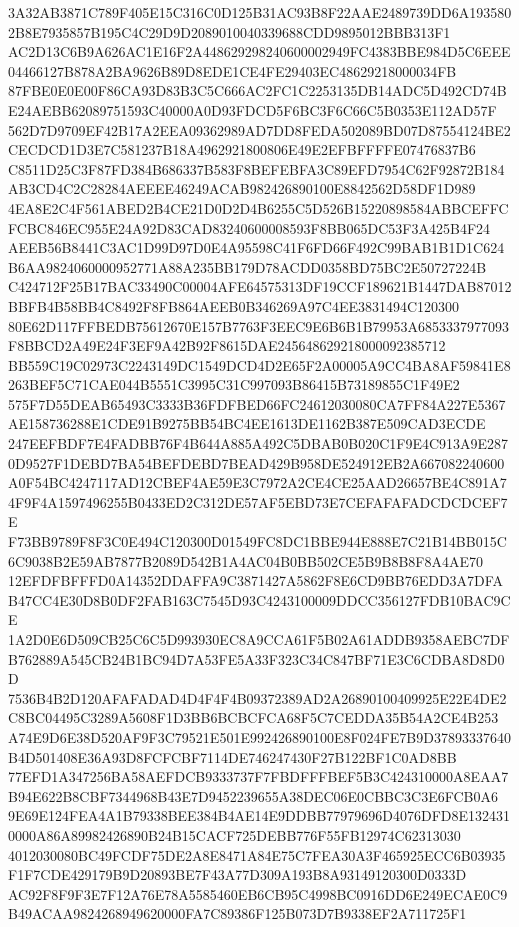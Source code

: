 \documentclass[UTF8,fontset=fandol,zihao=-4,a4paper]{ctexart}
\begin{document}
{{3A32AB3871C789F405E15C316C0D125B31AC93B8F22AAE2489739DD6A1935802B8E7935857B195C4C29D9D2089010040339688CDD9895012BBB313F1
AC2D13C6B9A626AC1E16F2A448629298240600002949FC4383BBE984D5C6EEE04466127B878A2BA9626B89D8EDE1CE4FE29403EC48629218000034FB
87FBE0E0E00F86CA93D83B3C5C666AC2FC1C2253135DB14ADC5D492CD74BE24AEBB62089751593C40000A0D93FDCD5F6BC3F6C66C5B0353E112AD57F
562D7D9709EF42B17A2EEA09362989AD7DD8FEDA502089BD07D87554124BE2CECDCD1D3E7C581237B18A4962921800806E49E2EFBFFFFE07476837B6
C8511D25C3F87FD384B686337B583F8BEFEBFA3C89EFD7954C62F92872B184AB3CD4C2C28284AEEEE46249ACAB982426890100E8842562D58DF1D989
4EA8E2C4F561ABED2B4CE21D0D2D4B6255C5D526B15220898584ABBCEFFCFCBC846EC955E24A92D83CAD83240600008593F8BB065DC53F3A425B4F24
AEEB56B8441C3AC1D99D97D0E4A95598C41F6FD66F492C99BAB1B1D1C624B6AA9824060000952771A88A235BB179D78ACDD0358BD75BC2E50727224B
C424712F25B17BAC33490C00004AFE64575313DF19CCF189621B1447DAB87012BBFB4B58BB4C8492F8FB864AEEB0B346269A97C4EE3831494C120300
80E62D117FFBEDB75612670E157B7763F3EEC9E6B6B1B79953A6853337977093F8BBCD2A49E24F3EF9A42B92F8615DAE245648629218000092385712
BB559C19C02973C2243149DC1549DCD4D2E65F2A00005A9CC4BA8AF59841E8263BEF5C71CAE044B5551C3995C31C997093B86415B73189855C1F49E2
575F7D55DEAB65493C3333B36FDFBED66FC24612030080CA7FF84A227E5367AE158736288E1CDE91B9275BB54BC4EE1613DE1162B387E509CAD3ECDE
247EEFBDF7E4FADBB76F4B644A885A492C5DBAB0B020C1F9E4C913A9E2870D9527F1DEBD7BA54BEFDEBD7BEAD429B958DE524912EB2A667082240600
A0F54BC4247117AD12CBEF4AE59E3C7972A2CE4CE25AAD26657BE4C891A74F9F4A1597496255B0433ED2C312DE57AF5EBD73E7CEFAFAFADCDCDCEF7E
F73BB9789F8F3C0E494C120300D01549FC8DC1BBE944E888E7C21B14BB015C6C9038B2E59AB7877B2089D542B1A4AC04B0BB502CE5B9B8B8F8A4AE70
12EFDFBFFFD0A14352DDAFFA9C3871427A5862F8E6CD9BB76EDD3A7DFAB47CC4E30D8B0DF2FAB163C7545D93C4243100009DDCC356127FDB10BAC9CE
1A2D0E6D509CB25C6C5D993930EC8A9CCA61F5B02A61ADDB9358AEBC7DFB762889A545CB24B1BC94D7A53FE5A33F323C34C847BF71E3C6CDBA8D8D0D
7536B4B2D120AFAFADAD4D4F4F4B09372389AD2A26890100409925E22E4DE2C8BC04495C3289A5608F1D3BB6BCBCFCA68F5C7CEDDA35B54A2CE4B253
A74E9D6E38D520AF9F3C79521E501E992426890100E8F024FE7B9D37893337640B4D501408E36A93D8FCFCBF7114DE746247430F27B122BF1C0AD8BB
77EFD1A347256BA58AEFDCB9333737F7FBDFFFBEF5B3C424310000A8EAA7B94E622B8CBF7344968B43E7D9452239655A38DEC06E0CBBC3C3E6FCB0A6
9E69E124FEA4A1B79338BEE384B4AE14E9DDBB77979696D4076DFD8E1324310000A86A89982426890B24B15CACF725DEBB776F55FB12974C62313030
4012030080BC49FCDF75DE2A8E8471A84E75C7FEA30A3F465925ECC6B03935F1F7CDE429179B9D20893BE7F43A77D309A193B8A93149120300D0333D
AC92F8F9F3E7F12A76E78A5585460EB6CB95C4998BC0916DD6E249ECAE0C9B49ACAA9824268949620000FA7C89386F125B073D7B9338EF2A711725F1
}}
\end{document}
